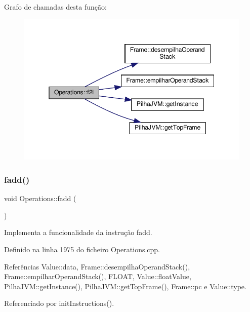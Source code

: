 Grafo de chamadas desta função\+:
\nopagebreak
\begin{figure}[H]
\begin{center}
\leavevmode
\includegraphics[width=345pt]{classOperations_a175cdab8d092bdd6c27bace9efbcd27e_cgraph}
\end{center}
\end{figure}
\mbox{\label{classOperations_a01a07c700f0f1574552437b76f3fdcb4}} 
\subsubsection{\texorpdfstring{fadd()}{fadd()}}
{\footnotesize\ttfamily void Operations\+::fadd (\begin{DoxyParamCaption}{ }\end{DoxyParamCaption})\hspace{0.3cm}{\ttfamily [private]}}



Implementa a funcionalidade da instrução fadd. 



Definido na linha 1975 do ficheiro Operations.\+cpp.



Referências Value\+::data, Frame\+::desempilha\+Operand\+Stack(), Frame\+::empilhar\+Operand\+Stack(), F\+L\+O\+AT, Value\+::float\+Value, Pilha\+J\+V\+M\+::get\+Instance(), Pilha\+J\+V\+M\+::get\+Top\+Frame(), Frame\+::pc e Value\+::type.



Referenciado por init\+Instructions().

